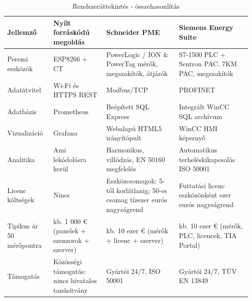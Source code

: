 \begin{table}[ht]
    \centering
    \begin{tabular}{|P{2.5cm}|P{3.5cm}|P{3.5cm}|P{3.5cm}|}
    \hline
    \textbf{Jellemző} & \textbf{Nyílt forráskódú megoldás} & \textbf{Schneider PME} & \textbf{Siemens Energy Suite} \\
    \hline
    Peremi eszközök &
    ESP8266 + CT &
    PowerLogic / ION \& PowerTag mérők, megszakítók, átjárók &
    S7-1500 PLC + Sentron PAC, 7KM PAC, megszakítók \\
    \hline
    Adatátvitel &
    Wi-Fi és HTTPS REST &
    Modbus/TCP &
    PROFINET\\
    \hline
    Adatbázis &
    Prometheus &
    Beépített SQL Express &
    Integrált WinCC SQL archívum \\
    \hline
    Vizualizáció &
    Grafana &
    Webalapú HTML5 irányítópult &
    WinCC HMI képernyő \\
    \hline
    Analitika &
    Ami lekódolásra kerül &
    Harmonikus, villódzás, EN 50160 megfelelés &
    Automatikus terheléskikapcsolás ISO 50001 \\
    \hline
    Licenc költségek &
    Nincs &
    Eszközcsomagok: 5-től korlátlanig; 50-es csomag tízezer eurós nagyságrend &
    Futtatási licenc eszközönként ezer eurós nagyságrend \\
    \hline
    Tipikus ár 50 mérőpontra &
    kb. 1 000 € (panelek + szenzorok + szerver) &
    kb. 10 ezer € (mérők + licenc + szerver) &
    kb. 10 ezer € (mérők, PLC, licencek, TIA Portal) \\
    \hline
    Támogatás &
    Közösségi támogatás; nincs hivatalos tanúsítvány &
    Gyártói 24/7, ISO 50001 &
    Gyártói 24/7, TÜV EN 13849 \\
    \hline
    \end{tabular}\caption{Rendszeráttekintés - összehasonlítás}
    \label{tab:osszehasonlitas}
\end{table}